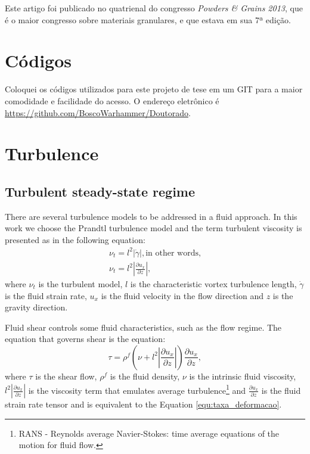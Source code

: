 \begin{apendicesenv}
    Este artigo foi publicado no quatrienal do congresso \textit{Powders \& Grains 2013}, que é o maior congresso sobre materiais granulares, e que estava em sua 7ª edição.



\chapter{Códigos}

    Coloquei os códigos utilizados para este projeto de tese em um GIT para a maior comodidade e facilidade do acesso. O endereço eletrônico é \url{https://github.com/BoscoWarhammer/Doutorado}.

\chapter{Turbulence}
\label{chap:Turbulence}
\section{Turbulent steady-state regime}

    There are several turbulence models to be addressed in a fluid approach. In this work we choose the Prandtl turbulence model and the term turbulent viscosity is presented as in the following equation:
\begin{equation}
    \begin{array}{l}
        \nu_{t} = l^2\left|\dot{\gamma}\right|, \textrm{in other words,} \\
        \nu_{t} = l^2\left|\frac{\partial u_{x}}{\partial z}\right|,
    \end{array}
    \label{equ:viscosidade_turbulenta}
\end{equation}
where $\nu_{t}$ is the turbulent model, $l$ is the characteristic vortex turbulence length, $\dot{\gamma}$ is the fluid strain rate, $u_x$ is the fluid velocity in the flow direction and $z$ is the gravity direction.

    Fluid shear controls some fluid characteristics, such as the flow regime. The equation that governs shear is the equation:
\begin{equation}
    \tau = \rho^{f}\left(\nu+l^{2}\left|\frac{\partial u_{x}}{\partial z}\right|\right)\frac{\partial u_{x}}{\partial z},
    \label{equ:cisalhamento}
\end{equation}
where $\tau$ is the shear flow, $\rho^f$ is the fluid density, $\nu$ is the intrinsic fluid viscosity, $l^2 \left|\frac{\partial u_{x}}{\partial z}\right|$ is the viscosity term that emulates average turbulence\footnote{RANS - Reynolds average Navier-Stokes: time average equations of the motion for fluid flow.} and $\frac{\partial u_{x}}{\partial z}$ is the fluid strain rate tensor and is equivalent to the Equation \ref{equ:taxa_deformacao}.


\end{apendicesenv}
